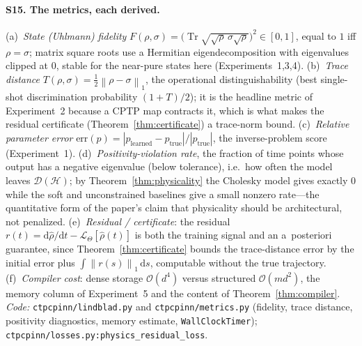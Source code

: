 \documentclass[11pt]{article}
\DeclareMathOperator{\Tr}{Tr}
\newcommand{\calD}{\mathcal{D}}
\newcommand{\calL}{\mathcal{L}}
\newcommand{\calO}{\mathcal{O}}
\newcommand{\dd}{\mathrm{d}}
\newcommand{\norm}[1]{\left\lVert #1 \right\rVert}
\newcommand{\abs}[1]{\left\lvert #1 \right\rvert}
\newcommand{\hilb}{\mathcal{H}}
\newcommand{\rhohat}{\widehat{\rho}}
\begin{document}
\paragraph{S15. The metrics, each derived.}
(a)~\emph{State (Uhlmann) fidelity} $F(\rho,\sigma)=\big(\Tr\sqrt{\sqrt{\rho}\,\sigma\sqrt{\rho}}\big)^2\in[0,1]$, equal to $1$ iff $\rho=\sigma$; matrix square roots use a Hermitian eigendecomposition with eigenvalues clipped at $0$, stable for the near-pure states here (Experiments~1,3,4). (b)~\emph{Trace distance} $T(\rho,\sigma)=\tfrac12\norm{\rho-\sigma}_1$, the operational distinguishability (best single-shot discrimination probability $(1+T)/2$); it is the headline metric of Experiment~2 because a CPTP map contracts it, which is what makes the residual certificate (Theorem~\ref{thm:certificate}) a trace-norm bound. (c)~\emph{Relative parameter error} $\mathrm{err}(p)=\abs{p_{\mathrm{learned}}-p_{\mathrm{true}}}/\abs{p_{\mathrm{true}}}$, the inverse-problem score (Experiment~1). (d)~\emph{Positivity-violation rate}, the fraction of time points whose output has a negative eigenvalue (below tolerance), i.e.\ how often the model leaves $\calD(\hilb)$; by Theorem~\ref{thm:physicality} the Cholesky model gives exactly $0$ while the soft and unconstrained baselines give a small nonzero rate---the quantitative form of the paper's claim that physicality should be architectural, not penalized. (e)~\emph{Residual / certificate}: the residual $r(t)=\dd\rhohat/\dd t-\calL_\Theta[\rhohat(t)]$ is both the training signal and an a~posteriori guarantee, since Theorem~\ref{thm:certificate} bounds the trace-distance error by the initial error plus $\int\norm{r(s)}_1\,\dd s$, computable without the true trajectory. (f)~\emph{Compiler cost}: dense storage $\calO(d^4)$ versus structured $\calO(m d^2)$, the memory column of Experiment~5 and the content of Theorem~\ref{thm:compiler}. \emph{Code:} \texttt{ctpcpinn/lindblad.py} and \texttt{ctpcpinn/metrics.py} (fidelity, trace distance, positivity diagnostics, memory estimate, \texttt{WallClockTimer}); \texttt{ctpcpinn/losses.py:physics\_residual\_loss}.
\end{document}

